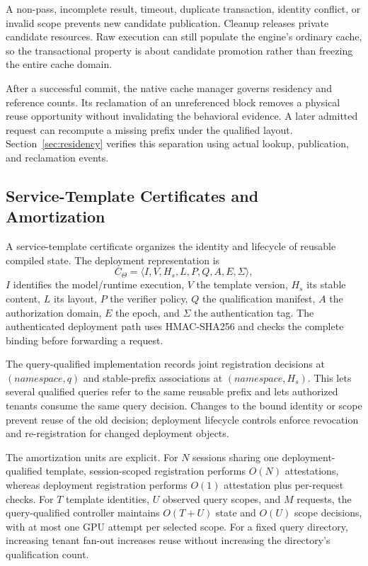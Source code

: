 A non-pass, incomplete result, timeout, duplicate transaction, identity conflict, or invalid scope prevents new candidate publication. Cleanup releases private candidate resources. Raw execution can still populate the engine's ordinary cache, so the transactional property is about candidate promotion rather than freezing the entire cache domain.

After a successful commit, the native cache manager governs residency and reference counts. Its reclamation of an unreferenced block removes a physical reuse opportunity without invalidating the behavioral evidence. A later admitted request can recompute a missing prefix under the qualified layout. Section~\ref{sec:residency} verifies this separation using actual lookup, publication, and reclamation events.

\subsection{Service-Template Certificates and Amortization}
\label{sec:template}
A service-template certificate organizes the identity and lifecycle of reusable compiled state. The deployment representation is
\begin{equation}
 C_\Theta=\langle I,V,H_s,L,P,Q,A,E,\Sigma\rangle,
\end{equation}
$I$ identifies the model/runtime execution, $V$ the template version, $H_s$ its stable content, $L$ its layout, $P$ the verifier policy, $Q$ the qualification manifest, $A$ the authorization domain, $E$ the epoch, and $\Sigma$ the authentication tag. The authenticated deployment path uses HMAC-SHA256 and checks the complete binding before forwarding a request.

The query-qualified implementation records joint registration decisions at $(\textit{namespace},q)$ and stable-prefix associations at $(\textit{namespace},H_s)$. This lets several qualified queries refer to the same reusable prefix and lets authorized tenants consume the same query decision. Changes to the bound identity or scope prevent reuse of the old decision; deployment lifecycle controls enforce revocation and re-registration for changed deployment objects.

The amortization units are explicit. For $N$ sessions sharing one deployment-qualified template, session-scoped registration performs $O(N)$ attestations, whereas deployment registration performs $O(1)$ attestation plus per-request checks. For $T$ template identities, $U$ observed query scopes, and $M$ requests, the query-qualified controller maintains $O(T+U)$ state and $O(U)$ scope decisions, with at most one GPU attempt per selected scope. For a fixed query directory, increasing tenant fan-out increases reuse without increasing the directory's qualification count.

